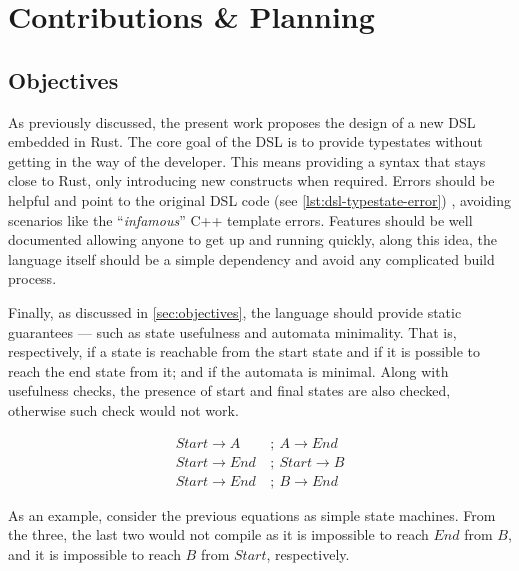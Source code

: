 \chapter{Contributions \& Planning}\label{cha:planning}


\section{Objectives}

As previously discussed, the present work proposes the design of a new DSL embedded in Rust.
The core goal of the DSL is to provide typestates without getting in the way of the developer.
This means providing a syntax that stays close to Rust, only introducing new constructs when required.
Errors should be helpful and point to the original DSL code (see \autoref{lst:dsl-typestate-error})
, avoiding scenarios like the “\emph{infamous}” C++ template errors.
Features should be well documented allowing anyone to get up and running quickly,
along this idea, the language itself should be a simple dependency and avoid any complicated build process.

Finally, as discussed in \autoref{sec:objectives}, the language should provide static guarantees ---
such as state usefulness and automata minimality.
That is, respectively, if a state is reachable from the start state and if it is possible to reach the end state from it;
and if the automata is minimal.
Along with usefulness checks, the presence of start and final states are also checked,
otherwise such check would not work.

\begin{align}
    Start \rightarrow A~   & ;~A \rightarrow End   \\
    Start \rightarrow End~ & ;~Start \rightarrow B \\
    Start \rightarrow End~ & ;~B \rightarrow End
\end{align}

As an example, consider the previous equations as simple state machines.
From the three, the last two would not compile as it is impossible to reach $End$ from $B$, and it is impossible to reach $B$ from $Start$, respectively.

